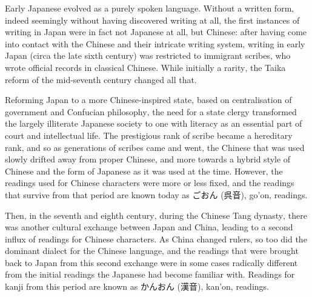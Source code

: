 \documentclass[11pt, b5paper, twoside, openright, onecolumn]{book}
\makeatletter
\newcommand*{\rubystack}[2]{{\relscale{0.5}%
  \begin{tabular}[b]{@{}c@{}}%
    {#1}\\%
   {\textscale{2}{#2}}%
  \end{tabular}}%
}
\DeclareRobustCommand*{\ruby}[2]{%
  \mbox{%
    \setlength{\parskip}{0ex}%
    \BeginAccSupp{method=pdfstringdef,ActualText={#1}}%
      \rubystack{\phantom{#2}}{#1}%
      \llap{%
        \rubystack{#2}{\phantom{#1}}%
      }%
    \EndAccSupp{}%
  }%
}
\renewcommand*{\ruby}[2]{#2 (#1)}%
\makeatother
\begin{document}
Early Japanese evolved as a purely spoken language. Without a written form‚ indeed seemingly without having discovered writing at all‚ the first instances of writing in Japan were in fact not Japanese at all‚ but Chinese: after having come into contact with the Chinese and their intricate writing system‚ writing in early Japan (circa the late sixth century) was restricted to immigrant scribes‚ who wrote official records in classical Chinese. While initially a rarity‚ the Taika reform of the mid-seventh century changed all that.

Reforming Japan to a more Chinese-inspired state‚ based on centralisation of government and Confucian philosophy‚ the need for a state clergy transformed the largely illiterate Japanese society to one with literacy as an essential part of court and intellectual life. The prestigious rank of scribe became a hereditary rank‚ and so as generations of scribes came and went‚ the Chinese that was used slowly drifted away from proper Chinese‚ and more towards a hybrid style of Chinese and the form of Japanese as it was used at the time. However‚ the readings used for Chinese characters were more or less fixed‚ and the readings that survive from that period are known today as \ruby{呉音}{ごおん}‚ go’on‚ readings.

Then‚ in the seventh and eighth century‚ during the Chinese Tang dynasty‚ there was another cultural exchange between Japan and China‚ leading to a second influx of readings for Chinese characters. As China changed rulers‚ so too did the dominant dialect for the Chinese language‚ and the readings that were brought back to Japan from this second exchange were in some cases radically different from the initial readings the Japanese had become familiar with. Readings for kanji from this period are known as \ruby{漢音}{かんおん}‚ kan’on‚ readings.
\end{document}
